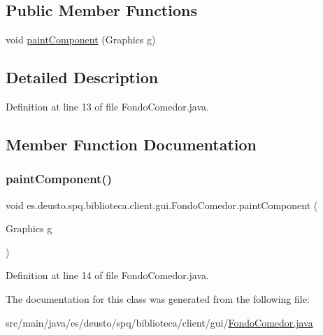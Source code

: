 \subsection*{Public Member Functions}
\begin{DoxyCompactItemize}
\item 
void \mbox{\hyperlink{classes_1_1deusto_1_1spq_1_1biblioteca_1_1client_1_1gui_1_1_fondo_comedor_aeb5871f500a09b68f3a55a1be4476ead}{paint\+Component}} (Graphics g)
\end{DoxyCompactItemize}


\subsection{Detailed Description}


Definition at line 13 of file Fondo\+Comedor.\+java.



\subsection{Member Function Documentation}
\mbox{\label{classes_1_1deusto_1_1spq_1_1biblioteca_1_1client_1_1gui_1_1_fondo_comedor_aeb5871f500a09b68f3a55a1be4476ead}} 
\subsubsection{\texorpdfstring{paint\+Component()}{paintComponent()}}
{\footnotesize\ttfamily void es.\+deusto.\+spq.\+biblioteca.\+client.\+gui.\+Fondo\+Comedor.\+paint\+Component (\begin{DoxyParamCaption}\item[{Graphics}]{g }\end{DoxyParamCaption})}



Definition at line 14 of file Fondo\+Comedor.\+java.



The documentation for this class was generated from the following file\+:\begin{DoxyCompactItemize}
\item 
src/main/java/es/deusto/spq/biblioteca/client/gui/\mbox{\hyperlink{_fondo_comedor_8java}{Fondo\+Comedor.\+java}}\end{DoxyCompactItemize}
